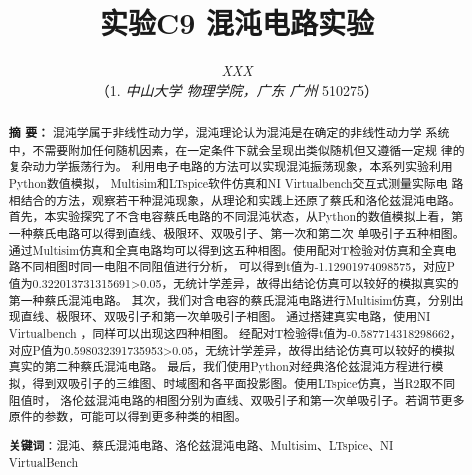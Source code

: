 \documentclass[10pt,a4paper,twoside,UTF8]{ctexart}
\begin{document}
\title{\LARGE\textbf{实验C9 混沌电路实验}\footnotemark[1]}
\author{\large\textit{XXX\footnotemark[2]}
\\ \normalsize{（1. \textit{中山大学 物理学院，广东 广州 }510275）}}
\date{}%


	\maketitle  %
  	\renewcommand{\abstractname} {} %
	\begin{abstract}
	\vspace{-3em}
	{\bf 摘{} 要：}
	{\small 
	混沌学属于非线性动力学，混沌理论认为混沌是在确定的非线性动力学
	系统中，不需要附加任何随机因素，在一定条件下就会呈现出类似随机但又遵循一定规
	律的复杂动力学振荡行为。
	利用电子电路的方法可以实现混沌振荡现象，本系列实验利用Python数值模拟，
	Multisim和LTspice软件仿真和NI Virtualbench交互式测量实际电
    路相结合的方法，观察若干种混沌现象，从理论和实践上还原了蔡氏和洛伦兹混沌电路。
	首先，本实验探究了不含电容蔡氏电路的不同混沌状态，从Python的数值模拟上看，第一种蔡氏电路可以得到直线、极限环、双吸引子、第一次和第二次
	单吸引子五种相图。通过Multisim仿真和全真电路均可以得到这五种相图。使用配对T检验对仿真和全真电路不同相图时同一电阻不同阻值进行分析，
	可以得到t值为-1.12901974098575，对应P值为0.322013731315691>0.05，无统计学差异，故得出结论仿真可以较好的模拟真实的第一种蔡氏混沌电路。
	其次，我们对含电容的蔡氏混沌电路进行Multisim仿真，分别出现直线、极限环、双吸引子和第一次单吸引子相图。
	通过搭建真实电路，使用NI Virtualbench ，同样可以出现这四种相图。
	经配对T检验得t值为-0.587714318298662，对应P值为0.598032391735953>0.05，无统计学差异，故得出结论仿真可以较好的模拟真实的第二种蔡氏混沌电路。
	最后，我们使用Python对经典洛伦兹混沌方程进行模拟，得到双吸引子的三维图、时域图和各平面投影图。使用LTspice仿真，当R2取不同阻值时，
	洛伦兹混沌电路的相图分别为直线、双吸引子和第一次单吸引子。若调节更多原件的参数，可能可以得到更多种类的相图。
}
	\par%
	\textbf{关键词}：混沌、蔡氏混沌电路、洛伦兹混沌电路、Multisim、LTspice、NI VirtualBench
	\vspace{2em}
	\end{abstract}

\renewcommand{\thefootnote}{\fnsymbol{footnote}}
\end{document}
